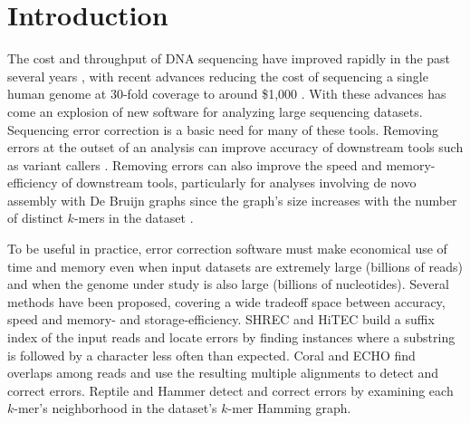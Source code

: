\documentclass[10pt]{article}
\begin{document}


\section*{Introduction}
The cost and throughput of DNA sequencing have improved rapidly in the past several years \cite{glenn2011field}, with recent advances reducing the cost of sequencing a single human genome at 30-fold coverage to around \$1,000 \cite{1kgenomeforreal}.
With these advances has come an explosion of new software for analyzing large sequencing datasets.
Sequencing error correction is a basic need for many of these tools.
Removing errors at the outset of an analysis can improve accuracy of downstream tools such as variant callers \cite{kelley2010quake}.
Removing errors can also improve the speed and memory-efficiency of downstream tools, particularly for analyses involving de novo assembly with De Bruijn graphs since the graph's size increases with the number of distinct $k$-mers in the dataset \cite{pevzner2001eulerian, chaisson2004fragment}.

To be useful in practice, error correction software must make economical use of time and memory even when input datasets are extremely large (billions of reads) and when the genome under study is also large (billions of nucleotides).
Several methods have been proposed, covering a wide tradeoff space between accuracy, speed and memory- and storage-efficiency.
SHREC \cite{schroder2009shrec} and HiTEC \cite{ilie2011hitec} build a suffix index of the input reads and locate errors by finding instances where a substring is followed by a character less often than expected.
Coral \cite{salmela2011correcting} and ECHO \cite{kao2011echo} find overlaps among reads and use the resulting multiple alignments to detect and correct errors.
Reptile \cite{yang2010reptile} and Hammer \cite{medvedev2011error} detect and correct errors by examining each $k$-mer's neighborhood in the dataset's $k$-mer Hamming graph.
\end{document}
